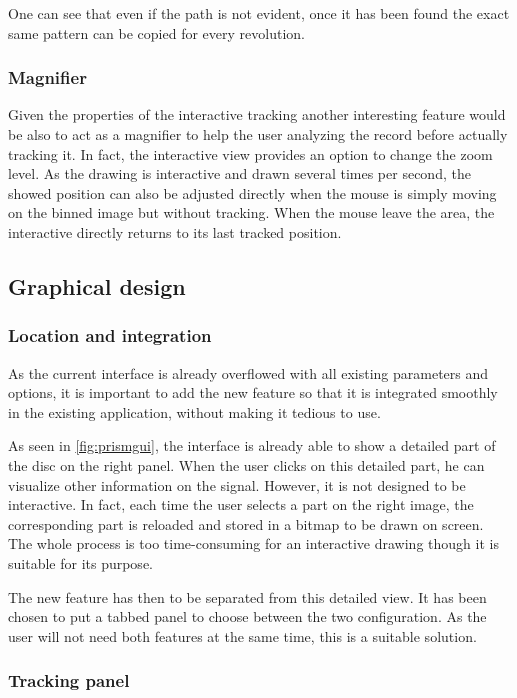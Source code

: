 One can see that even if the path is not evident, once it has been found the exact same pattern can be copied for every revolution.

\subsubsection{Magnifier}

Given the properties of the interactive tracking another interesting feature would be also to act as a magnifier to help the user analyzing the record before actually tracking it. In fact, the interactive view provides an option to change the zoom level. As the drawing is interactive and drawn several times per second, the showed position can also be adjusted directly when the mouse is simply moving on the binned image but without tracking. When the mouse leave the area, the interactive directly returns to its last tracked position.

\subsection{Graphical design}

\subsubsection{Location and integration}

As the current interface is already overflowed with all existing parameters and options, it is important to add the new feature so that it is integrated smoothly in the existing application, without making it tedious to use.

As seen in \autoref{fig:prismgui}, the interface is already able to show a detailed part of the disc on the right panel. When the user clicks on this detailed part, he can visualize other information on the signal. However, it is not designed to be interactive. In fact, each time the user selects a part on the right image, the corresponding part is reloaded and stored in a bitmap to be drawn on screen. The whole process is too time-consuming for an interactive drawing though it is suitable for its purpose.

The new feature has then to be separated from this detailed view. It has been chosen to put a tabbed panel to choose between the two configuration. As the user will not need both features at the same time, this is a suitable solution.

\subsubsection{Tracking panel}

